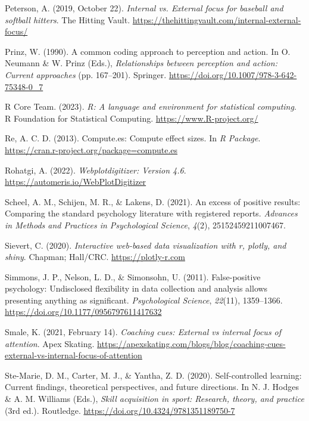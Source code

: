 \documentclass[
  man, donotrepeattitle,floatsintext]{apa7}
\newlength{\cslhangindent}
\newlength{\cslentryspacingunit} %
\newenvironment{CSLReferences}[2] %
 {%
  \setlength{\parindent}{0pt}
  \ifodd #1
  \let\oldpar\par
  \def\par{\hangindent=\cslhangindent\oldpar}
  \fi
  \setlength{\parskip}{#2\cslentryspacingunit}
 }%
 {}
\begin{document}
\begin{CSLReferences}{1}{0}
\leavevmode{}%
Peterson, A. (2019, October 22). \emph{Internal vs. External focus for baseball and softball hitters}. {The Hitting Vault}. \url{https://thehittingvault.com/internal-external-focus/}

\leavevmode{}%
Prinz, W. (1990). A common coding approach to perception and action. In O. Neumann \& W. Prinz (Eds.), \emph{Relationships between perception and action: {Current} approaches} (pp. 167--201). {Springer}. \url{https://doi.org/10.1007/978-3-642-75348-0_7}

\leavevmode{}%
R Core Team. (2023). \emph{R: A language and environment for statistical computing}. R Foundation for Statistical Computing. \url{https://www.R-project.org/}

\leavevmode{}%
Re, A. C. D. (2013). Compute.es: Compute effect sizes. In \emph{R Package}. \url{https://cran.r-project.org/package=compute.es}

\leavevmode{}%
Rohatgi, A. (2022). \emph{Webplotdigitizer: Version 4.6}. \url{https://automeris.io/WebPlotDigitizer}

\leavevmode{}%
Scheel, A. M., Schijen, M. R., \& Lakens, D. (2021). An excess of positive results: Comparing the standard psychology literature with registered reports. \emph{Advances in Methods and Practices in Psychological Science}, \emph{4}(2), 25152459211007467.

\leavevmode{}%
Sievert, C. (2020). \emph{Interactive web-based data visualization with r, plotly, and shiny}. Chapman; Hall/CRC. \url{https://plotly-r.com}

\leavevmode{}%
Simmons, J. P., Nelson, L. D., \& Simonsohn, U. (2011). False-positive psychology: {Undisclosed} flexibility in data collection and analysis allows presenting anything as significant. \emph{Psychological Science}, \emph{22}(11), 1359--1366. \url{https://doi.org/10.1177/0956797611417632}

\leavevmode{}%
Smale, K. (2021, February 14). \emph{Coaching cues: {External} vs internal focus of attention}. {Apex Skating}. \url{https://apexskating.com/blogs/blog/coaching-cues-external-vs-internal-focus-of-attention}

\leavevmode{}%
Ste-Marie, D. M., Carter, M. J., \& Yantha, Z. D. (2020). Self-controlled learning: {Current} findings, theoretical perspectives, and future directions. In N. J. Hodges \& A. M. Williams (Eds.), \emph{Skill acquisition in sport: {Research}, theory, and practice} (3rd ed.). Routledge. \url{https://doi.org/10.4324/9781351189750-7}


\end{CSLReferences}
\end{document}
